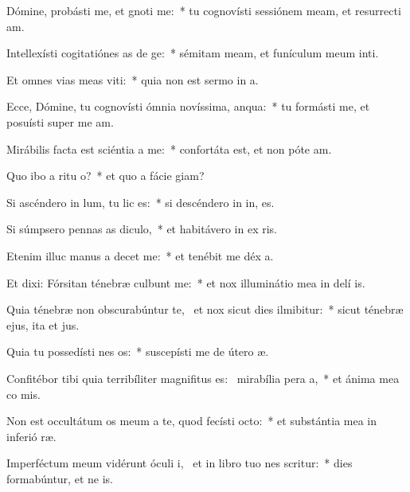 \item Dómine, probásti me, et gnoti me:~* tu cognovísti sessiónem meam, et resurrecti am.
\item Intellexísti cogitatiónes as de ge:~* sémitam meam, et funículum meum inti.
\item Et omnes vias meas viti:~* quia non est sermo in  a.
\item Ecce, Dómine, tu cognovísti ómnia novíssima,  anqua:~* tu formásti me, et posuísti super me  am.
\item Mirábilis facta est sciéntia a  me:~* confortáta est, et non póte  am.
\item Quo ibo a ritu o?~* et quo a fácie  giam?
\item Si ascéndero in lum, tu lic es:~* si descéndero in in, es.
\item Si súmpsero pennas as diculo,~* et habitávero in ex ris.
\item Etenim illuc manus a decet me:~* et tenébit me déx a.
\item Et dixi: Fórsitan ténebræ culbunt me:~* et nox illuminátio mea in delí is.
\item Quia ténebræ non obscurabúntur  te,~\pscross{} et nox sicut dies ilmibitur:~* sicut ténebræ ejus, ita et  jus.
\item Quia tu possedísti nes os:~* suscepísti me de útero  æ.
\item Confitébor tibi quia terribíliter magnifitus es:~\pscross{} mirabília pera a,~* et ánima mea co mis.
\item Non est occultátum os meum a te, quod fecísti  octo:~* et substántia mea in inferió ræ.
\item Imperféctum meum vidérunt óculi i,~\pscross{} et in libro tuo nes scritur:~* dies formabúntur, et ne  is.
